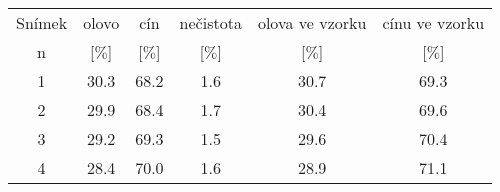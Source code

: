 \begin{tabular}[t]{
  S[table-format=1.0]
  S[table-format=2.1]
  S[table-format=2.1]
  S[table-format=1.1]
  S[table-format=2.1]
  S[table-format=2.1]
} \toprule
{Snímek} & {olovo}               & {cín}             & {nečistota}         & {olova ve vzorku}    & {cínu ve vzorku}   \\
{n}      & {[$\si{\percent}$]} & {[$\si{\percent}$]} & {[$\si{\percent}$]} & {[$\si{\percent}$]} & {[$\si{\percent}$]} \\  &                30.3 &                68.2 &                 1.6 &                30.7 &                69.3 \\
       2 &                29.9 &                68.4 &                 1.7 &                30.4 &                69.6 \\
       3 &                29.2 &                69.3 &                 1.5 &                29.6 &                70.4 \\
       4 &                28.4 &                70.0 &                 1.6 &                28.9 &                71.1 \\ \bottomrule
\end{tabular}